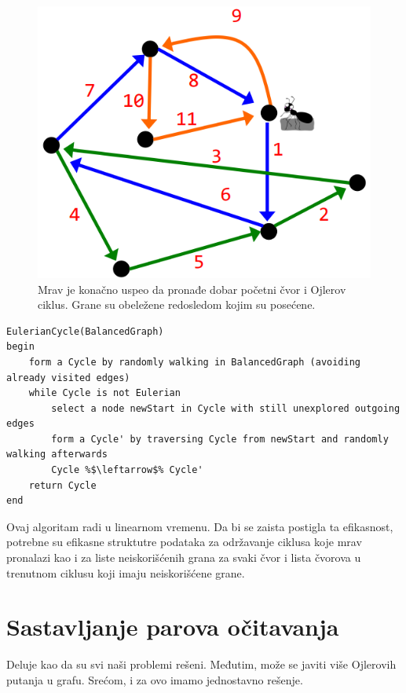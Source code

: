 \begin{minipage}{\textwidth}
\begin{minipage}{0.45\textwidth}
\begin{figure}[H]
			\includegraphics[width=\textwidth]{poglavlja/3/slike/mrav4.png}
			\caption{Mrav je konačno uspeo da pronađe dobar početni čvor i Ojlerov ciklus. Grane su obeležene redosledom kojim su posećene.}
			\label{slika:mrav4}
		\end{figure} 
	\end{minipage}
	\vspace*{1em}
\end{minipage}

\begin{lstlisting}
EulerianCycle(BalancedGraph)
begin
	form a Cycle by randomly walking in BalancedGraph (avoiding already visited edges)
	while Cycle is not Eulerian
		select a node newStart in Cycle with still unexplored outgoing edges
		form a Cycle' by traversing Cycle from newStart and randomly walking afterwards
		Cycle %$\leftarrow$% Cycle'
	return Cycle
end
\end{lstlisting}

Ovaj algoritam radi u linearnom vremenu. Da bi se zaista postigla ta efikasnost, potrebne su efikasne struktutre podataka za održavanje ciklusa koje mrav pronalazi kao i za liste neiskorišćenih grana za svaki čvor i lista čvorova u trenutnom ciklusu koji imaju neiskorišćene grane.

\section{Sastavljanje parova očitavanja}

Deluje kao da su svi naši problemi rešeni. Međutim, može se javiti više Ojlerovih putanja u grafu. Srećom, i za ovo imamo jednostavno rešenje.

